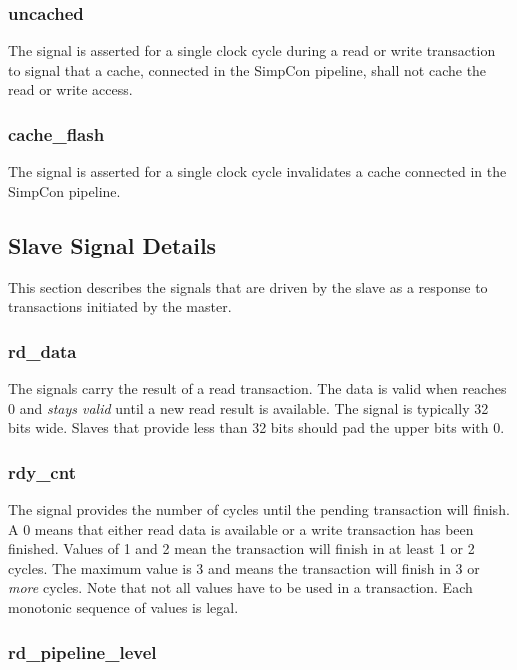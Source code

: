\subsubsection{uncached}

The  signal is asserted for a single clock cycle
during a read or write transaction to signal that a cache, connected
in the SimpCon pipeline, shall not cache the read or write access.

\subsubsection{cache\_flash}

The  signal is asserted for a single clock cycle
invalidates a cache connected in the SimpCon pipeline.

\subsection{Slave Signal Details}

This section describes the signals that are driven by the slave as a
response to transactions initiated by the master.

\subsubsection{rd\_data}

The  signals carry the result of a read transaction.
The data is valid when  reaches 0 and \emph{stays
valid} until a new read result is available. The signal is typically
32 bits wide. Slaves that provide less than 32 bits should pad the
upper bits with 0.

\subsubsection{rdy\_cnt}

The  signal provides the number of cycles until the
pending transaction will finish. A 0 means that either read data is
available or a write transaction has been finished. Values of 1 and 2
mean the transaction will finish in at least 1 or 2 cycles. The
maximum value is 3 and means the transaction will finish in 3 or
\emph{more} cycles. Note that not all values have to be used in a
transaction. Each monotonic sequence of  values is
legal.

\subsubsection{rd\_pipeline\_level}


